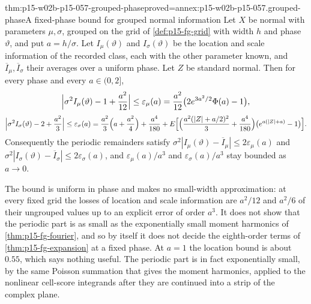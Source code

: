 \begin{hbtheorem}{thm:p15-w02b-p15-057-grouped-phase}{proved=annex:p15-w02b-p15-057.grouped-phase}{A fixed-phase bound for grouped normal information}
Let \(X\) be normal with parameters \(\mu,\sigma\), grouped on the grid of
\cref{def:p15-fg-grid} with width \(h\) and phase \(\vartheta\), and put
\(a=h/\sigma\). Let \(I_\mu(\vartheta)\) and \(I_\sigma(\vartheta)\) be the
location and scale information of the recorded class, each with the other
parameter known, and \(\overline I_\mu,\overline I_\sigma\) their averages
over a uniform phase. Let \(Z\) be standard normal. Then for every phase
and every \(a\in(0,2]\),
\[
 \Bigl|\sigma^2I_\mu(\vartheta)-1+\frac{a^2}{12}\Bigr|\leq
 \varepsilon_\mu(a)=\frac{a^2}{12}\bigl(2e^{3a^2/2}\Phi(a)-1\bigr),
\]
\[
 \Bigl|\sigma^2I_\sigma(\vartheta)-2+\frac{a^2}{3}\Bigr|\leq
 \varepsilon_\sigma(a)=\frac{a^2}3\Bigl(a+\frac{a^2}4\Bigr)+\frac{a^4}{180}
 +E\Bigl[\Bigl(\frac{a^2(|Z|+a/2)^2}{3}+\frac{a^4}{180}\Bigr)
 \bigl(e^{a(|Z|+a)}-1\bigr)\Bigr].
\]
Consequently the periodic remainders satisfy
\(\sigma^2|I_\mu(\vartheta)-\overline I_\mu|\leq2\varepsilon_\mu(a)\) and
\(\sigma^2|I_\sigma(\vartheta)-\overline I_\sigma|\leq2\varepsilon_\sigma(a)\),
and \(\varepsilon_\mu(a)/a^3\) and \(\varepsilon_\sigma(a)/a^3\) stay bounded
as \(a\to0\).
\end{hbtheorem}

The bound is uniform in phase and makes no small-width approximation: at
every fixed grid the losses of location and scale information are
\(a^2/12\) and \(a^2/6\) of their ungrouped values up to an explicit error
of order \(a^3\). It does not show that the periodic part is as small as the
exponentially small moment harmonics of \cref{thm:p15-fg-fourier}, and so
by itself it does not decide the eighth-order terms of
\cref{thm:p15-fg-expansion} at a fixed phase. At \(a=1\) the location bound
is about \(0.55\), which says nothing useful. The periodic part is in fact
exponentially small, by the same Poisson summation that gives the moment
harmonics, applied to the nonlinear cell-score integrands after they are
continued into a strip of the complex plane.

